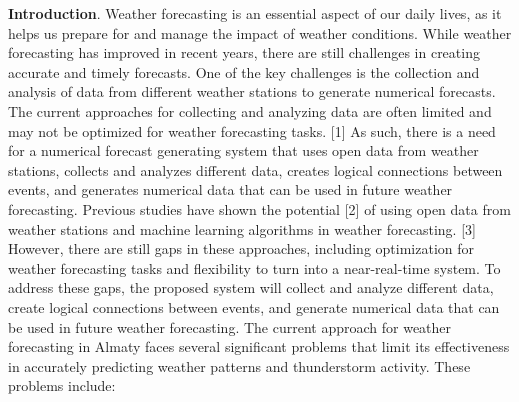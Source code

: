 {\bfseries Introduction}. Weather forecasting is an essential aspect of our
daily lives, as it helps us prepare for and manage the impact of weather
conditions. While weather forecasting has improved in recent years,
there are still challenges in creating accurate and timely forecasts.
One of the key challenges is the collection and analysis of data from
different weather stations to generate numerical forecasts. The current
approaches for collecting and analyzing data are often limited and may
not be optimized for weather forecasting tasks. {[}1{]} As such, there
is a need for a numerical forecast generating system that uses open data
from weather stations, collects and analyzes different data, creates
logical connections between events, and generates numerical data that
can be used in future weather forecasting. Previous studies have shown
the potential {[}2{]} of using open data from weather stations and
machine learning algorithms in weather forecasting. {[}3{]} However,
there are still gaps in these approaches, including optimization for
weather forecasting tasks and flexibility to turn into a near-real-time
system. To address these gaps, the proposed system will collect and
analyze different data, create logical connections between events, and
generate numerical data that can be used in future weather forecasting.
The current approach for weather forecasting in Almaty faces several
significant problems that limit its effectiveness in accurately
predicting weather patterns and thunderstorm activity. These problems
include:

